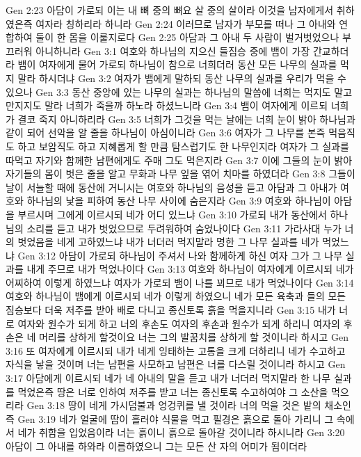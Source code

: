 Gen 2:23  아담이 가로되 이는 내 뼈 중의 뼈요 살 중의 살이라 이것을 남자에게서 취하였은즉 여자라 칭하리라 하니라
Gen 2:24  이러므로 남자가 부모를 떠나 그 아내와 연합하여 둘이 한 몸을 이룰지로다
Gen 2:25  아담과 그 아내 두 사람이 벌거벗었으나 부끄러워 아니하니라
Gen 3:1  여호와 하나님의 지으신 들짐승 중에 뱀이 가장 간교하더라 뱀이 여자에게 물어 가로되 하나님이 참으로 너희더러 동산 모든 나무의 실과를 먹지 말라 하시더냐
Gen 3:2  여자가 뱀에게 말하되 동산 나무의 실과를 우리가 먹을 수 있으나
Gen 3:3  동산 중앙에 있는 나무의 실과는 하나님의 말씀에 너희는 먹지도 말고 만지지도 말라 너희가 죽을까 하노라 하셨느니라
Gen 3:4  뱀이 여자에게 이르되 너희가 결코 죽지 아니하리라
Gen 3:5  너희가 그것을 먹는 날에는 너희 눈이 밝아 하나님과 같이 되어 선악을 알 줄을 하나님이 아심이니라
Gen 3:6  여자가 그 나무를 본즉 먹음직도 하고 보암직도 하고 지혜롭게 할 만큼 탐스럽기도 한 나무인지라 여자가 그 실과를 따먹고 자기와 함께한 남편에게도 주매 그도 먹은지라
Gen 3:7  이에 그들의 눈이 밝아 자기들의 몸이 벗은 줄을 알고 무화과 나무 잎을 엮어 치마를 하였더라
Gen 3:8  그들이 날이 서늘할 때에 동산에 거니시는 여호와 하나님의 음성을 듣고 아담과 그 아내가 여호와 하나님의 낯을 피하여 동산 나무 사이에 숨은지라
Gen 3:9  여호와 하나님이 아담을 부르시며 그에게 이르시되 네가 어디 있느냐
Gen 3:10  가로되 내가 동산에서 하나님의 소리를 듣고 내가 벗었으므로 두려워하여 숨었나이다
Gen 3:11  가라사대 누가 너의 벗었음을 네게 고하였느냐 내가 너더러 먹지말라 명한 그 나무 실과를 네가 먹었느냐
Gen 3:12  아담이 가로되 하나님이 주셔서 나와 함께하게 하신 여자 그가 그 나무 실과를 내게 주므로 내가 먹었나이다
Gen 3:13  여호와 하나님이 여자에게 이르시되 네가 어찌하여 이렇게 하였느냐 여자가 가로되 뱀이 나를 꾀므로 내가 먹었나이다
Gen 3:14  여호와 하나님이 뱀에게 이르시되 네가 이렇게 하였으니 네가 모든 육축과 들의 모든 짐승보다 더욱 저주를 받아 배로 다니고 종신토록 흙을 먹을지니라
Gen 3:15  내가 너로 여자와 원수가 되게 하고 너의 후손도 여자의 후손과 원수가 되게 하리니 여자의 후손은 네 머리를 상하게 할것이요 너는 그의 발꿈치를 상하게 할 것이니라 하시고
Gen 3:16  또 여자에게 이르시되 내가 네게 잉태하는 고통을 크게 더하리니 네가 수고하고 자식을 낳을 것이며 너는 남편을 사모하고 남편은 너를 다스릴 것이니라 하시고
Gen 3:17  아담에게 이르시되 네가 네 아내의 말을 듣고 내가 너더러 먹지말라 한 나무 실과를 먹었은즉 땅은 너로 인하여 저주를 받고 너는 종신토록 수고하여야 그 소산을 먹으리라
Gen 3:18  땅이 네게 가시덤불과 엉겅퀴를 낼 것이라 너의 먹을 것은 밭의 채소인즉
Gen 3:19  네가 얼굴에 땀이 흘러야 식물을 먹고 필경은 흙으로 돌아 가리니 그 속에서 네가 취함을 입었음이라 너는 흙이니 흙으로 돌아갈 것이니라 하시니라
Gen 3:20  아담이 그 아내를 하와라 이름하였으니 그는 모든 산 자의 어미가 됨이더라
